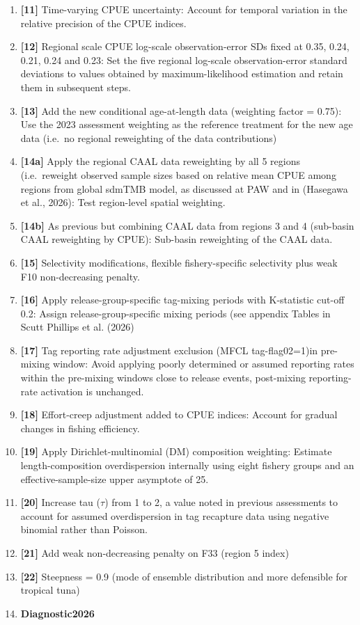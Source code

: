 \documentclass[
  english,
  a4paper,
  a4paper,
  11pt]{SCreport}
\begin{document}
\begin{enumerate}
  selectivity and catchability, strong recommendation from PAW and
  yellowfin assessment peer review (Hamer, 2026; Punt et al., 2023).
\item
  \textbf{{[}11{]}} Time-varying CPUE uncertainty: Account for temporal
  variation in the relative precision of the CPUE indices.
\item
  \textbf{{[}12{]}} Regional scale CPUE log-scale observation-error SDs
  fixed at 0.35, 0.24, 0.21, 0.24 and 0.23: Set the five regional
  log-scale observation-error standard deviations to values obtained by
  maximum-likelihood estimation and retain them in subsequent steps.
\item
  \textbf{{[}13{]}} Add the new conditional age-at-length data
  (weighting factor = 0.75): Use the 2023 assessment weighting as the
  reference treatment for the new age data (i.e.~no regional reweighting
  of the data contributions)
\item
  \textbf{{[}14a{]}} Apply the regional CAAL data reweighting by all 5
  regions (i.e.~reweight observed sample sizes based on relative mean
  CPUE among regions from global sdmTMB model, as discussed at PAW and
  in (Hasegawa et al., 2026): Test region-level spatial weighting.
\item
  \textbf{{[}14b{]}} As previous but combining CAAL data from regions 3
  and 4 (sub-basin CAAL reweighting by CPUE): Sub-basin reweighting of
  the CAAL data.
\item
  \textbf{{[}15{]}} Selectivity modifications, flexible fishery-specific
  selectivity plus weak F10 non-decreasing penalty.
\item
  \textbf{{[}16{]}} Apply release-group-specific tag-mixing periods with
  K-statistic cut-off 0.2: Assign release-group-specific mixing periods
  (see appendix Tables in Scutt Phillips et al. (2026)
\item
  \textbf{{[}17{]}} Tag reporting rate adjustment exclusion (MFCL
  tag-flag02=1)in pre-mixing window: Avoid applying poorly determined or
  assumed reporting rates within the pre-mixing windows close to release
  events, post-mixing reporting-rate activation is unchanged.
\item
  \textbf{{[}18{]}} Effort-creep adjustment added to CPUE indices:
  Account for gradual changes in fishing efficiency.
\item
  \textbf{{[}19{]}} Apply Dirichlet-multinomial (DM) composition
  weighting: Estimate length-composition overdispersion internally using
  eight fishery groups and an effective-sample-size upper asymptote of
  25.
\item
  \textbf{{[}20{]}} Increase tau (\(\tau\)) from 1 to 2, a value noted
  in previous assessments to account for assumed overdispersion in tag
  recapture data using negative binomial rather than Poisson.
\item
  \textbf{{[}21{]}} Add weak non-decreasing penalty on F33 (region 5
  index)
\item
  \textbf{{[}22{]}} Steepness = 0.9 (mode of ensemble distribution and
  more defensible for tropical tuna)
\item
  \textbf{Diagnostic2026}
\end{enumerate}
\end{document}

